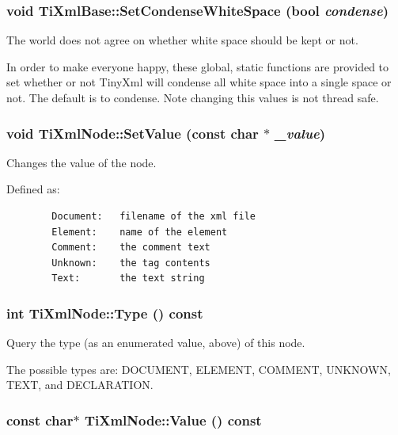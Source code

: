 \subsubsection{\setlength{\rightskip}{0pt plus 5cm}void Ti\-Xml\-Base::Set\-Condense\-White\-Space (bool {\em condense})\hspace{0.3cm}{\tt  [inline, static, inherited]}}\label{classTiXmlBase_TiXmlUnknowne0}


The world does not agree on whether white space should be kept or not. 

In order to make everyone happy, these global, static functions are provided to set whether or not Tiny\-Xml will condense all white space into a single space or not. The default is to condense. Note changing this values is not thread safe.
\subsubsection{\setlength{\rightskip}{0pt plus 5cm}void Ti\-Xml\-Node::Set\-Value (const char $\ast$ {\em \_\-value})\hspace{0.3cm}{\tt  [inline, inherited]}}\label{classTiXmlNode_TiXmlUnknowna9}


Changes the value of the node. 

Defined as: 

\footnotesize\begin{verbatim}
		Document:	filename of the xml file
		Element:	name of the element
		Comment:	the comment text
		Unknown:	the tag contents
		Text:		the text string
		\end{verbatim}
\normalsize
{}
\subsubsection{\setlength{\rightskip}{0pt plus 5cm}int Ti\-Xml\-Node::Type () const\hspace{0.3cm}{\tt  [inline, inherited]}}\label{classTiXmlNode_TiXmlUnknowna62}


Query the type (as an enumerated value, above) of this node. 

The possible types are: DOCUMENT, ELEMENT, COMMENT, UNKNOWN, TEXT, and DECLARATION.
\subsubsection{\setlength{\rightskip}{0pt plus 5cm}const char$\ast$ Ti\-Xml\-Node::Value () const\hspace{0.3cm}{\tt  [inline, inherited]}}\label{classTiXmlNode_TiXmlUnknowna7}


